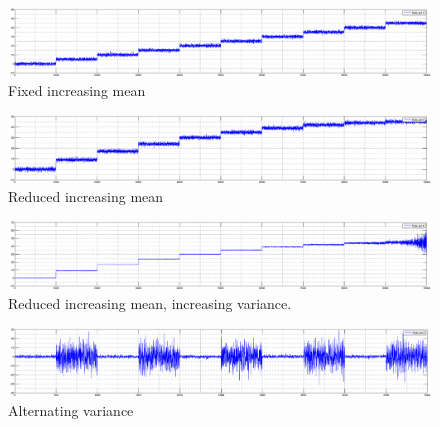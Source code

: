 \begin{figure}
\centering
  \includegraphics[width=1\textwidth]{./Figures/chapter5/set_1_data.eps}
  \caption[Fixed increasing mean]{Fixed increasing mean}
  \label{fig:camci_fixed_increasing_mean}
\end{figure}

\begin{figure}
\centering
  \includegraphics[width=1\textwidth]{./Figures/chapter5/set_2_data.eps}
  \caption[Reduced increasing mean]{Reduced increasing mean}
  \label{fig:takeuchi_reduced_increasing_mean}
\end{figure}

\begin{figure}
\centering
  \includegraphics[width=1\textwidth]{./Figures/chapter5/set_3_data.eps}
  \caption[Reduced increasing mean, increasing variance]{Reduced increasing mean, increasing variance.}
  \label{fig:camci_reduced_increasing_mean_increasing_variance}
\end{figure}

\begin{figure}
\centering
  \includegraphics[width=1\textwidth]{./Figures/chapter5/set_4_data.eps}
  \caption[Alternating variance]{Alternating variance}
  \label{fig:camci_takeuchi_alternating_variance}
\end{figure}